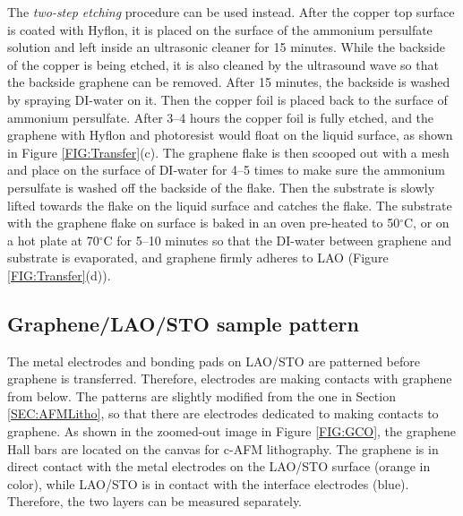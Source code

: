 \documentclass[pdflatex, sectionletters, 12pt]{pittetd}    %
\begin{document}
The \emph{two-step etching} procedure can be used instead. After the copper top surface is coated with Hyflon, it is placed on the surface of the ammonium persulfate solution and left inside an ultrasonic cleaner for 15 minutes. While the backside of the copper is being etched, it is also cleaned by the ultrasound wave so that the backside graphene can be removed. After 15 minutes, the backside is washed by spraying DI-water on it. Then the copper foil is placed back to the surface of ammonium persulfate. After 3--4 hours the copper foil is fully etched, and the graphene with Hyflon and photoresist would float on the liquid surface, as shown in Figure \ref{FIG:Transfer}(c). The graphene flake is then scooped out with a mesh and place on the surface of DI-water for 4--5 times to make sure the ammonium persulfate is washed off the backside of the flake. Then the substrate is slowly lifted towards the flake on the liquid surface and catches the flake. The substrate with the graphene flake on surface is baked in an oven pre-heated to 50$^{\circ}$C, or on a hot plate at 70$^{\circ}$C for 5--10 minutes so that the DI-water between graphene and substrate is evaporated, and graphene firmly adheres to LAO (Figure \ref{FIG:Transfer}(d)).

\subsection{Graphene/LAO/STO sample pattern}

The metal electrodes and bonding pads on LAO/STO are patterned before graphene is transferred. Therefore, electrodes are making contacts with graphene from below. The patterns are slightly modified from the one in Section \ref{SEC:AFMLitho}, so that there are electrodes dedicated to making contacts to graphene. As shown in the zoomed-out image in Figure \ref{FIG:GCO}, the graphene Hall bars are located on the canvas for c-AFM lithography. The graphene is in direct contact with the metal electrodes on the LAO/STO surface (orange in color), while LAO/STO is in contact with the interface electrodes (blue). Therefore, the two layers can be measured separately. 
\end{document}
